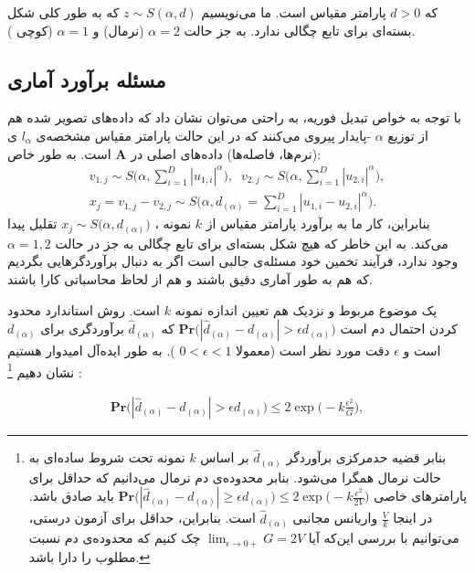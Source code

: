 که 
$d>0$
پارامتر مقیاس است. ما می‌نویسیم 
$z \sim S(\alpha, d)$
که به طور کلی شکل بسته‌ای برای تابع چگالی ندارد. به جز حالت 
$\alpha = 2$
(نرمال) و 
$\alpha = 1$
(کوچی
).


\subsection{
مسئله برآورد آماری
}

با توجه به خواص تبدیل فوریه، به راحتی می‌توان نشان داد که داده‌های تصویر شده هم از توزیع 
$\alpha$
-پایدار پیروی می‌کنند که در این حالت پارامتر مقیاس مشخصه‌ی 
$l_\alpha$
ی (نرم‌ها، فاصله‌ها) داده‌های اصلی در 
$\mathbf{A}$
است. به طور خاص:
\begin{align}
v_{1,j} \sim S \bigg( \alpha, \sum_{i=1}^D |u_{1,i}|^\alpha \bigg), \;\;
v_{2,j} \sim S \bigg( \alpha, \sum_{i=1}^D |u_{2,i}|^\alpha \bigg),
 \label{eq:1hp}\\
x_j = v_{1,j} - v_{2,j} \sim S \bigg( \alpha, d_{(\alpha)} = 
\sum_{i=1}^D | u_{1,i} - u_{2,i} |^\alpha \bigg).
 \label{eq:1hq}
\end{align}
بنابراین، کار ما به برآورد پارامتر مقیاس از 
$k$
نمونه 
، 
$x_j \sim S \big( \alpha, d_{(\alpha)} \big)$
تقلیل پیدا می‌کند. به این خاطر که هیچ شکل بسته‌ای برای تابع چگالی به جز در حالت 
$\alpha = 1,2$
وجود ندارد، فرآیند تخمین خود مسئله‌ی جالبی است اگر به دنبال برآوردگرهایی بگردیم که هم به طور آماری دقیق باشند و هم از لحاظ محاسباتی کارا باشند.

یک موضوع مربوط و نزدیک هم تعیین اندازه نمونه
$k$
است. روش استاندارد محدود کردن احتمال دم است 
$\mathbf{Pr} \big( | \hat{d}_{(\alpha)} - d_{(\alpha)} | > \epsilon d_{(\alpha)} \big)$
که 
$\hat{d}_{(\alpha)}$
برآوردگری برای
$d_{(\alpha)}$
است و 
$\epsilon$
دقت مورد نظر است (معمولا 
$0<\epsilon<1$
). به طور ایده‌آل امیدوار هستیم نشان دهیم
\footnote{
بنابر قضیه حدمرکزی برآوردگر 
$\hat{d}_{(\alpha)}$
بر اساس
$k$
نمونه تحت شروط ساده‌ای به حالت نرمال همگرا می‌شود. بنابر محدوده‌ی دم نرمال می‌دانیم که حداقل برای پارامترهای خاصی 
$\mathbf{Pr} \big( | \hat{d}_{(\alpha)} - d_{(\alpha)} | \geq \epsilon d_{(\alpha)} \big) \leq 2 \exp \Big( -k \frac{\epsilon^2}{2V} \Big)$
باید صادق باشد. در اینجا 
$\frac{V}{k}$
واریانس مجانبی 
$\hat{d}_{(\alpha)}$
است. بنابراین، حداقل برای آزمون درستی، می‌توانیم با بررسی این‌که آیا
$\lim_{\epsilon \rightarrow 0+} G = 2V$
چک کنیم که محدوده‌ی دم نسبت مطلوب را دارا باشد.
}
:

\begin{align}
\mathbf{Pr} \big( | \hat{d}_{(\alpha)} - d_{(\alpha)}| > \epsilon d_{(\alpha)} \big) \leq 2 \exp \bigg( -k \frac{\epsilon^2}{G} \bigg),
\label{eq:1hr}
\end{align}

